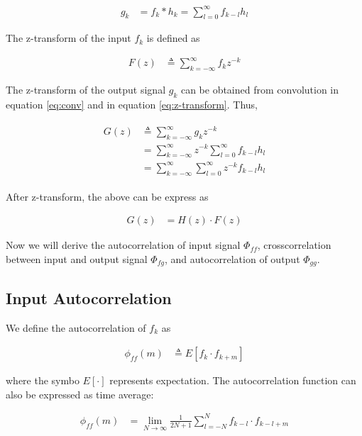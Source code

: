 \documentclass[8pt,a4paper]{article}
\begin{document}
\begin{multicols}{2}
\begin{align}
\label{eq:conv}
  g_{k} &= f_{k} * h_{k} 
        = \sum_{l=0}^{\infty} f_{k-l}h_{l} 
\end{align}

The z-transform of the input $f_{k}$ is defined as

\begin{align}
  \label{eq:z-transform}
  F(z)&\triangleq \sum_{k=-\infty}^{\infty} f_{k}z^{-k}
\end{align}

The z-transform of the output signal $g_{k}$ can be obtained from convolution in equation \ref{eq:conv} and in equation \ref{eq:z-transform}. Thus, 

\begin{align}
  \begin{split}
  G(z)&\triangleq \sum_{k=-\infty}^{\infty} g_{k}z^{-k}\\
      &=\sum_{k=-\infty}^{\infty} z^{-k} \sum_{l=0}^{\infty} f_{k-l}h_{l} \\
      &=\sum_{k=-\infty}^{\infty} \sum_{l=0}^{\infty} z^{-k}f_{k-l}h_{l}
  \end{split}
\end{align}

After z-transform, the above can be express as

\begin{align}
  G(z) &= H(z) \cdot F(z)
\end{align}

Now we will derive the autocorrelation of input signal $\Phi_{ff}$, crosscorrelation between input and output signal $\Phi_{fg}$, and autocorrelation of output $\Phi_{gg}$. 

\subsection*{Input Autocorrelation}
We define the autocorrelation of $f_{k}$ as

\begin{align}
  \phi_{ff}(m) &\triangleq E \left[ f_{k} \cdot f_{k+m} \right]
\end{align}

where the symbo $E[\cdot]$ represents expectation. The autocorrelation function can also be expressed as time average:

\begin{align}
  \phi_{ff}(m) &= \lim_{N\rightarrow\infty} \frac{1}{2N+1} \sum_{l=-N}^{N} f_{k-l} \cdot f_{k-l+m}
\end{align}


\end{multicols}
\end{document}
